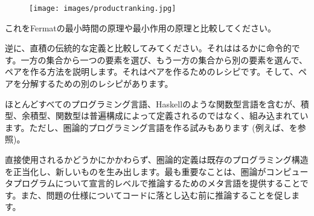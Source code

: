 \begin{figure}[H]
  \centering
  \texttt{[image: images/productranking.jpg]}
\end{figure}

\noindent
これをFermatの最小時間の原理や最小作用の原理と比較してください。

逆に、直積の伝統的な定義と比較してみてください。それははるかに命令的です。一方の集合から一つの要素を選び、もう一方の集合から別の要素を選んで、ペアを作る方法を説明します。それはペアを作るためのレシピです。そして、ペアを分解するための別のレシピがあります。

ほとんどすべてのプログラミング言語、Haskellのような関数型言語を含むが、積型、余積型、関数型は普遍構成によって定義されるのではなく、組み込まれています。ただし、圏論的プログラミング言語を作る試みもあります (例えば、を参照)。

直接使用されるかどうかにかかわらず、圏論的定義は既存のプログラミング構造を正当化し、新しいものを生み出します。最も重要なことは、圏論がコンピュータプログラムについて宣言的レベルで推論するためのメタ言語を提供することです。また、問題の仕様についてコードに落とし込む前に推論することを促します。

